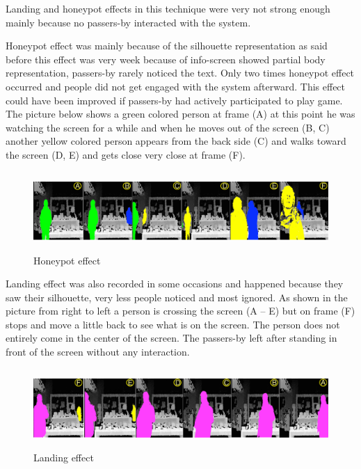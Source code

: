 Landing and honeypot effects in this technique were very not strong enough mainly because no passers-by interacted with the system.

Honeypot effect was mainly because of the silhouette representation as said before this effect was very week because of info-screen showed partial body representation, passers-by rarely noticed the text. Only two times honeypot effect occurred and people did not get engaged with the system afterward. This effect could have been improved if passers-by had actively participated to play game.  The picture below shows a green colored person at frame (A) at this point he was watching the screen for a while and when he moves out of the screen (B, C) another yellow colored person appears from the back side (C) and walks toward the screen (D, E) and gets close very close at frame (F).

\begin{minipage}{0.95\textwidth}
\begin{flushright}
\begin{figure}[H]
    \centering
    \includegraphics[width=\textwidth,height=30mm]{Figures/8/mobile_inter_findings/effects/honeypot}
    \caption{Honeypot effect}
    \label{fig:mobile_honeypoteffect}
\end{figure}
\end{flushright}
\end{minipage}


Landing effect was also recorded in some occasions and happened because they saw their silhouette, very less people noticed and most ignored. As shown in the picture from right to left a person is crossing the screen (A – E) but on frame (F) stops and move a little back to see what is on the screen. The person does not entirely come in the center of the screen. The passers-by left after standing in front of the screen without any interaction.

\begin{minipage}{0.95\textwidth}
\begin{flushright}
\begin{figure}[H]
    \centering
    \includegraphics[width=\textwidth,height=30mm]{Figures/8/mobile_inter_findings/effects/landing}
    \caption{Landing effect}
    \label{fig:mobile_landingeffect}
\end{figure}
\end{flushright}
\end{minipage}



